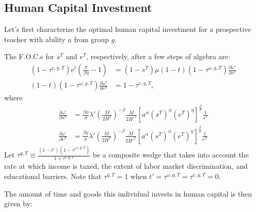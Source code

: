 \documentclass[onehalfspacing,11pt]{article}
\begin{document}
\subsection{Human Capital Investment}
Let's first characterize the optimal human capital investment for a prospective teacher with ability $a$ from group $g$.%

The F.O.C.s for $s^T$ and $e^T$, respectively, after a few steps of algebra are:
\begin{align}
\label{eq:foc-e}
(1-\tau^{e,g,T}) e^t \left( \frac{\sigma}{\beta \eta}-1 \right) & = \left(1-s^T\right) \mu(1-t)(1-\tau^{\omega,g,T}) \frac{\partial \omega'}{\partial s^T} \\
\label{eq:foc-s}
(1-t)(1-\tau^{\omega,g,T}) \frac{\partial \omega'}{\partial e^T} & = 1-\tau^{e,g,T},
\end{align}
where
\begin{align}
 \frac{\partial \omega'}{\partial s^T} & =  \frac{\beta \phi}{\sigma} \lambda' \left(\frac{M}{2 H^T}\right)^{-\beta} \frac{M}{2 {{H'}^T}} \left[ a^\alpha (s^T)^\phi (e^T)^\eta \right]^{\frac{\beta}{\sigma}} \frac{1}{s^T} \label{eq:sT} \\
 \frac{\partial \omega'}{\partial e^T} & = \frac{\beta \eta}{\sigma} \lambda' \left(\frac{M}{2 H^T}\right)^{-\beta} \frac{M}{2 {{H'}^T}} \left[ a^\alpha (s^T)^\phi (e^T)^\eta \right]^{\frac{\beta}{\sigma}} \frac{1}{e^T} \label{eq:eT}
\end{align}
Let $\tau^{g,T} \equiv \frac{\left( 1-t' \right) \left( 1-{\tau'}^{\omega,g,T} \right)}{1+\tau^{e,g,T}}$ be a composite wedge that takes into account the rate at which income is taxed, the extent of labor market discrimination, and educational barriers. Note that $\tau^{g,T}=1$ when $t' = \tau^{\omega,g,T} = \tau^{e,g,T} = 0$.

The amount of time and goods this individual invests in human capital is then given by:
\end{document}
